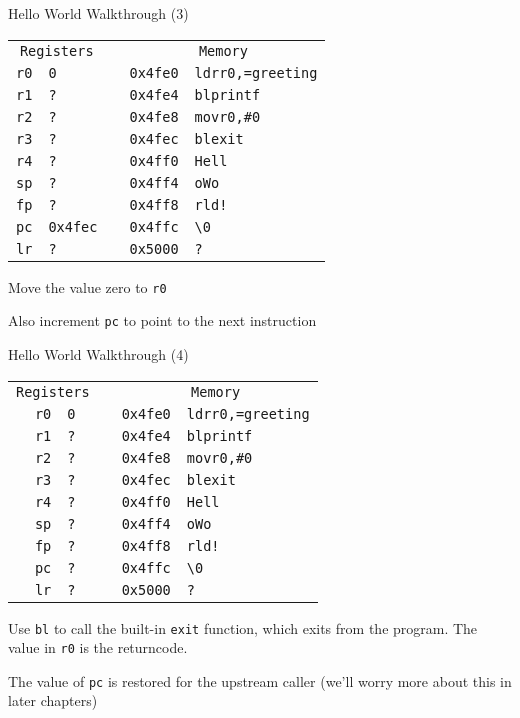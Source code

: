 \begin{frame}{Hello World Walkthrough (3)}
    \begin{alltt}
        \begin{tabular}{ r | l p{5mm} r | l }
            \multicolumn{2}{c}{Registers} && \multicolumn{2}{c}{Memory} \\
            r0 & 0 && 0x4fe0 & ldr r0, =greeting \\
            r1 & ? && 0x4fe4 & bl printf \\
            r2 & ? && 0x4fe8 & mov r0, \#0 \\
            r3 & ? && 0x4fec & bl exit \\
            r4 & ? && 0x4ff0 & Hell \\
            sp & ? && 0x4ff4 & o Wo \\
            fp & ? && 0x4ff8 & rld! \\
            pc & 0x4fec && 0x4ffc & {\textbackslash}0 \\
            lr & ? && 0x5000 & ? \\
            \end{tabular}
        \end{alltt}

        Move the value zero to \texttt{r0}

        Also increment \texttt{pc} to point to the next instruction


\end{frame}

\begin{frame}{Hello World Walkthrough (4)}
    \begin{alltt}
        \begin{tabular}{ r | l p{5mm} r | l }
            \multicolumn{2}{c}{Registers} && \multicolumn{2}{c}{Memory} \\
            r0 & 0 && 0x4fe0 & ldr r0, =greeting \\
            r1 & ? && 0x4fe4 & bl printf \\
            r2 & ? && 0x4fe8 & mov r0, \#0 \\
            r3 & ? && 0x4fec & bl exit \\
            r4 & ? && 0x4ff0 & Hell \\
            sp & ? && 0x4ff4 & o Wo \\
            fp & ? && 0x4ff8 & rld! \\
            pc & ? && 0x4ffc & {\textbackslash}0 \\
            lr & ? && 0x5000 & ? \\
        \end{tabular}
    \end{alltt}

    Use \texttt{bl} to call the built-in \texttt{exit} function, which exits from the program. The value in \texttt{r0} is the returncode.
    
    The value of \texttt{pc} is restored for the upstream caller (we'll worry more about this in later chapters)

\end{frame}



